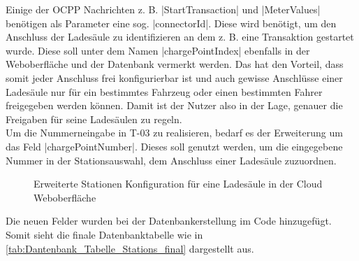 \noindent Einige der OCPP Nachrichten z. B. \spverb|StartTransaction| und \spverb|MeterValues| benötigen als Parameter eine sog. \spverb|connectorId|. Diese wird benötigt, um den Anschluss der Ladesäule zu identifizieren an dem z. B. eine Transaktion gestartet wurde. Diese soll unter dem Namen \spverb|chargePointIndex| ebenfalls in der Weboberfläche und der Datenbank vermerkt werden. Das hat den Vorteil, dass somit jeder Anschluss frei konfigurierbar ist und auch gewisse Anschlüsse einer Ladesäule nur für ein bestimmtes Fahrzeug oder einen bestimmten Fahrer freigegeben werden können. Damit ist der Nutzer also in der Lage, genauer die Freigaben für seine Ladesäulen zu regeln.\\

\noindent Um die Nummerneingabe in T-03 zu realisieren, bedarf es der Erweiterung um das Feld \spverb|chargePointNumber|. Dieses soll genutzt werden, um die eingegebene Nummer in der Stationsauswahl, dem Anschluss einer Ladesäule zuzuordnen.
\begin{figure}[H]
	\centering
	\caption{Erweiterte Stationen Konfiguration für eine Ladesäule in der Cloud Weboberfläche \cite{Kunde_Weboberflaeche}}
	\label{fig:Cloud_Schnittstell_konfig}
\end{figure}

\noindent Die neuen Felder wurden bei der Datenbankerstellung im Code hinzugefügt. Somit sieht die finale Datenbanktabelle wie in \autoref{tab:Dantenbank_Tabelle_Stations_final} dargestellt aus.


